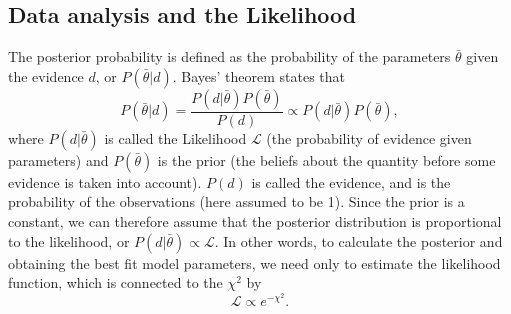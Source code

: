 \documentclass[aps,pre,twocolumn,letterpaper,floatfix,showpacs]{revtex4}
\begin{document}



\subsection{Data analysis and the Likelihood}

The posterior probability is defined as the probability of the parameters $\bar \theta$ given the evidence $d$, or $P(\bar \theta | d)$. Bayes' theorem states that 
\begin{equation}
P(\bar \theta | d) = \frac{P(d | \bar \theta)P(\bar \theta)}{P(d)} \propto P(d | \bar \theta)P(\bar \theta),
\end{equation}
where $P(d | \bar \theta)$ is called the Likelihood $\mathcal L$ (the probability of evidence given parameters) and $P(\bar \theta)$ is the prior (the beliefs about the quantity before some evidence is taken into account). $P(d)$ is called the evidence, and is the probability of the observations (here assumed to be 1). Since the prior is a constant, we can therefore assume that the posterior distribution is proportional to the likelihood, or $P(d | \bar \theta) \propto \mathcal L$. In other words, to calculate the posterior and obtaining the best fit model parameters, we need only to estimate the likelihood function, which is connected to the $\chi^2$ by 
\begin{equation}
\mathcal L \propto e^{-\chi^2}.
\end{equation}
\end{document}
